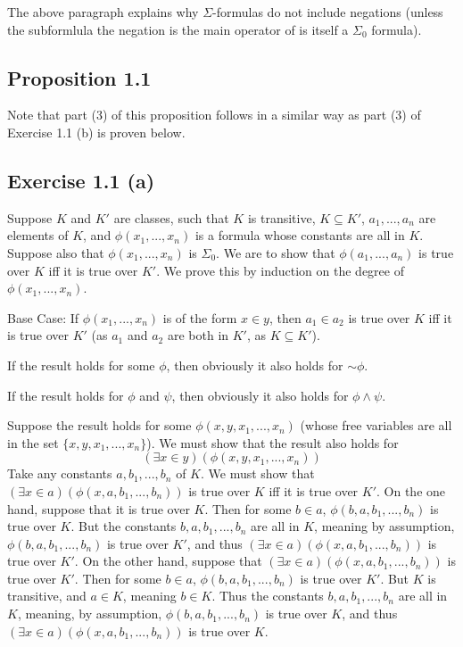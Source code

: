 \documentclass{article}
\newcommand*{\oldneg}{\mathord{\sim}}
\theoremstyle{definition}
\begin{document}
The above paragraph explains why $\Sigma$-formulas do not include negations (unless the subformlula the negation is the main operator of 
is itself a $\Sigma_0$ formula).

\subsection*{Proposition 1.1}
Note that part (3) of this proposition follows in a similar way as part (3) of Exercise 1.1 (b) is proven below.

\subsection*{Exercise 1.1 (a)}
Suppose $K$ and $K'$ are classes, such that $K$ is transitive, $K\subseteq K'$,
$a_1,...,a_n$ are elements of $K$, and $\phi(x_1,...,x_n)$ is a formula whose constants are all in 
$K$. Suppose also that $\phi(x_1,...,x_n)$ is $\Sigma_0$. We are to show that $\phi(a_1,...,a_n)$ is true 
over $K$ iff it is true over $K'$. We prove this by induction on the degree of $\phi(x_1,...,x_n)$.

Base Case: If $\phi(x_1,...,x_n)$ is of the form $x\in y$, then $a_1\in a_2$ is true over $K$ iff 
it is true over $K'$ (as $a_1$ and $a_2$ are both in $K'$, as $K\subseteq K'$).

If the result holds for some $\phi$, then obviously it also holds for $\oldneg\phi$.

If the result holds for $\phi$ and $\psi$, then obviously it also holds for $\phi\wedge\psi$.

Suppose the result holds for some $\phi(x,y,x_1,...,x_n)$ (whose free variables are all in the set 
$\{x,y,x_1,...,x_n\}$). We must show that the result also holds for 
\[ (\exists x\in y)(\phi(x,y,x_1,...,x_n)) \]
Take any constants $a,b_1,...,b_n$ of $K$. We must show that
$(\exists x\in a)(\phi(x,a,b_1,...,b_n))$ is true over $K$ iff it is true over $K'$. 
On the one hand, suppose that it is true over $K$. Then for some $b\in a$, 
$\phi(b,a,b_1,...,b_n)$ is true over $K$. But the constants $b,a,b_1,...,b_n$ are all in 
$K$, meaning by assumption, $\phi(b,a,b_1,...,b_n)$ is true over $K'$, and thus 
$(\exists x\in a)(\phi(x,a,b_1,...,b_n))$ is true over $K'$. On the other hand, suppose that 
$(\exists x\in a)(\phi(x,a,b_1,...,b_n))$ is true over $K'$. Then for some $b\in a$, 
$\phi(b,a,b_1,...,b_n)$ is true over $K'$. But $K$ is transitive, and $a\in K$, meaning 
$b\in K$. Thus the constants $b,a,b_1,...,b_n$ are all in $K$, meaning, by assumption, 
$\phi(b,a,b_1,...,b_n)$ is true over $K$, and thus 
$(\exists x\in a)(\phi(x,a,b_1,...,b_n))$ is true over $K$.
\end{document}
